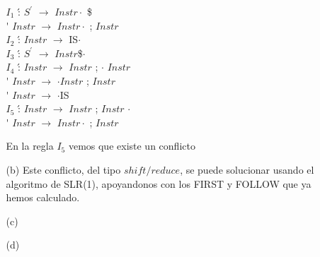 \documentclass{article}
\begin{document}
\begin{enumerate}
\begin{enumerate}
\begin{tabbing}
						\> $I_{1}$	\' : 	\> $S^{\prime}$		\> $\longrightarrow$\> 	$Instr \cdot$ \$	\\
						\>			\'  	\> $Instr$ 			\> $\longrightarrow$\> 	$Instr \cdot$ ; $Instr$	\\

						\>$I_{2}$	\' : 	\> $Instr$ 			\> $\longrightarrow$\> 	IS$\cdot$	\\

						\>$I_{3}$	\' : 	\> $S^{\prime}$		\> $\longrightarrow$\> 	$Instr$\$$\cdot$	\\

						\>$I_{4}$	\' : 	\> $Instr$			\> $\longrightarrow$\> 	$Instr$ ; $\cdot$ $Instr$	\\
						\>			\'  	\> $Instr$ 			\> $\longrightarrow$\> 	$\cdot Instr$ ; $Instr$	\\
						\>			\'  	\> $Instr$ 			\> $\longrightarrow$\> 	$\cdot$IS	\\

						\>$I_{5}$	\' : 	\> $Instr$			\> $\longrightarrow$\> 	$Instr$ ; $Instr$ $\cdot$	\\
						\>			\'  	\> $Instr$ 			\> $\longrightarrow$\> 	$Instr \cdot$ ; $Instr$	\\
					\end{tabbing}

					En la regla $I_{5}$ vemos que existe un conflicto 

					\item[(b)]Este conflicto, del tipo $shift/reduce$, se puede solucionar usando el algoritmo de SLR(1), apoyandonos con los FIRST y FOLLOW que ya hemos calculado.

					\item[(c)]

					\item[(d)]
					
					\end{enumerate}
									
			\end{enumerate}
\end{document}
